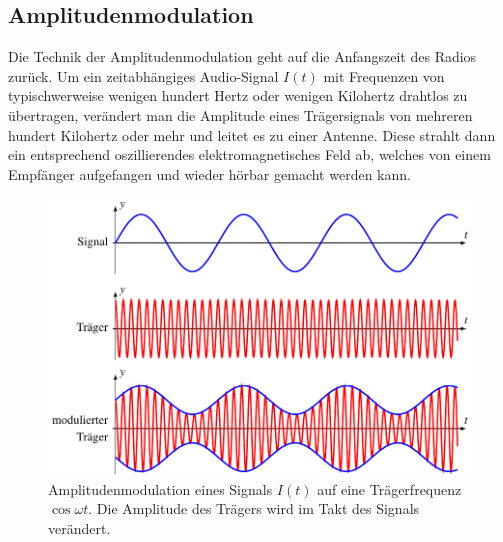 %
%
%
\subsection{Amplitudenmodulation
\label{subsection:amplitudenmodulation}}
Die Technik der Amplitudenmodulation geht auf die Anfangszeit des
Radios zurück.
Um ein zeitabhängiges Audio-Signal $I(t)$ mit Frequenzen von typischwerweise
wenigen hundert Hertz oder wenigen Kilohertz drahtlos zu übertragen,
verändert man die Amplitude eines Trägersignals von mehreren hundert
Kilohertz oder mehr und leitet es zu einer Antenne.
Diese strahlt dann ein entsprechend oszillierendes elektromagnetisches
Feld ab, welches von einem Empfänger aufgefangen und wieder hörbar gemacht
werden kann.

\begin{figure}
\centering
\includegraphics{applications/qam/images/am.pdf}
\caption{Amplitudenmodulation eines Signals $I(t)$ auf eine
Trägerfrequenz $\cos\omega t$.
Die Amplitude des Trägers wird im Takt des Signals verändert.
\label{figure:qam:am}}
\end{figure}

